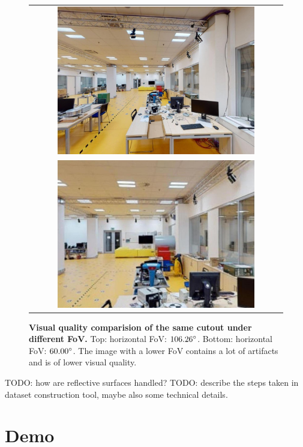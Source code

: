 \documentclass[twoside]{ctuthesis}
\theoremstyle{plain}
\theoremstyle{definition}
\theoremstyle{note}
\begin{document}
\begin{figure}
    \centering
    {
    \begin{tabular}{c}
    \includegraphics[width=0.8\textwidth]{cutout_19_-90_0_FoV106} \\
    \includegraphics[width=0.8\textwidth]{cutout_19_-90_0_FoV60}
    \end{tabular}
	\caption{{\bf Visual quality comparision of the same cutout under different FoV.} Top: horizontal FoV: $106.26\degree$. Bottom: horizontal FoV: $60.00\degree$. The image with a lower FoV contains a lot of artifacts and is of lower visual quality.}
	\label{fig:fov-quality}
    }
\end{figure}

TODO: how are reflective surfaces handled?
TODO: describe the steps taken in dataset construction tool, maybe also some technical details.

\chapter{Demo}
\end{document}
